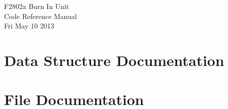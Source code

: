 \documentclass{book}
\begin{document}
\hypersetup{pageanchor=false,citecolor=blue}
\begin{titlepage}
\vspace*{7cm}
\begin{center}
{\Large F2802x Burn In Unit}\\
\vspace*{1cm}
{\large Code Reference Manual}\\
\vspace*{0.5cm}
{\small Fri May 10 2013}\\
\end{center}
\end{titlepage}
\clearemptydoublepage
{}
\tableofcontents
\clearemptydoublepage
{}
\hypersetup{pageanchor=true,citecolor=blue}
\chapter{Data Structure Documentation}


\chapter{File Documentation}















\printindex
\end{document}
